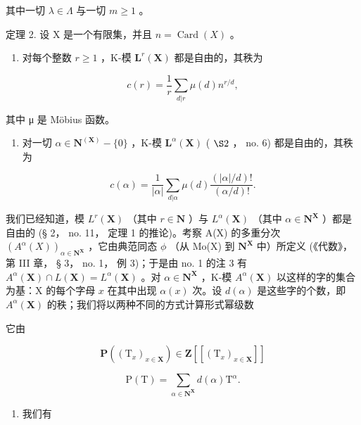 其中一切 \(\lambda\in\Lambda\) 与一切 \(m\geqslant1\) 。

定理 2. 设 X 是一个有限集，并且 \(n = \operatorname{Card}(X)\) 。

\begin{enumerate}
\def\labelenumi{(\alph{enumi})}
\tightlist
\item
  对每个整数 \(r \geqslant 1\) ，K-模 \(\mathbf{L}^r(\mathbf{X})\) 都是自由的，其秩为
\end{enumerate}

\[
c (r) = \frac {1}{r} \sum_ {d | r} \mu (d) n ^ {r / d},\tag{15}
\]

其中 μ 是 Möbius 函数。

\begin{enumerate}
\def\labelenumi{(\alph{enumi})}
\setcounter{enumi}{1}
\tightlist
\item
  对一切 \(\alpha \in \mathbf{N}^{(\mathbf{X})} - \{0\}\) ，K-模 \(\mathbf{L}^{\alpha}(\mathbf{X})\) ( \(\S 2\) ， no. 6) 都是自由的，其秩为
\end{enumerate}

\[
c (\alpha) = \frac {1}{| \alpha |} \sum_ {d | \alpha} \mu (d) \frac {(| \alpha | / d) !}{(\alpha / d) !}.\tag{16}
\]

我们已经知道，模 \(L^{r}(\mathbf{X})\) （其中 \(r \in \mathbf{N}\) ）与 \(L^{\alpha}(\mathbf{X})\) （其中 \(\alpha \in \mathbf{N}^{\mathbf{X}}\) ）都是自由的 (§ 2， no. 11， 定理 1 的推论)。考察 A(X) 的多重分次 \((A^{\alpha}(X))_{\alpha \in \mathbf{N}^{\mathbf{X}}}\) ，它由典范同态 \(\phi\) （从 Mo(X) 到 \(\mathbf{N}^{\mathbf{X}}\) 中）所定义 (《代数》， 第 III 章， § 3， no. 1， 例 3)；于是由 no. 1 的注 3 有 \(A^{\alpha}(\mathbf{X}) \cap L(\mathbf{X}) = L^{\alpha}(\mathbf{X})\) 。对 \(\alpha \in \mathbf{N}^{\mathbf{X}}\) ，K-模 \(A^{\alpha}(\mathbf{X})\) 以这样的字的集合为基：X 的每个字母 \(x\) 在其中出现 \(\alpha(x)\) 次。设 \(d(\alpha)\) 是这些字的个数，即 \(A^{\alpha}(\mathbf{X})\) 的秩；我们将以两种不同的方式计算形式幂级数

它由

\[
\mathbf {P} ((\mathrm{T} _ {x}) _ {x \in \mathbf {X}}) \in \mathbf {Z} [ [ (\mathrm{T} _ {x}) _ {x \in \mathbf {X}} ] ]\tag{17}
\]

\[
\mathrm{P} (\mathrm{T}) = \sum_ {\alpha \in \mathbf {N} ^ {\mathbf {X}}} d (\alpha) \mathrm{T} ^ {\alpha}.
\]

\begin{enumerate}
\def\labelenumi{(\arabic{enumi})}
\tightlist
\item
  我们有
\end{enumerate}

